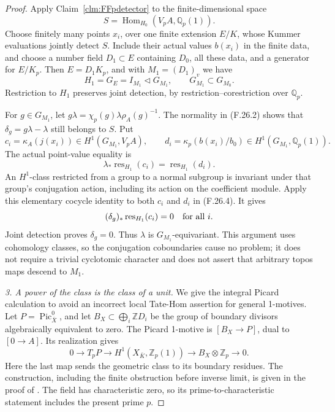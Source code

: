 \documentclass[11pt]{article}
\begin{document}
\begin{proof}
Apply Claim~\ref{clm:FFpdetector} to the finite-dimensional
space
\[
                  S=\operatorname{Hom}_{H_0}
                       (V_pA,\mathbb Q_p(1)).
\]
Choose finitely many points \(x_i\), over one finite
extension \(E/K\), whose Kummer evaluations jointly
detect \(S\). Include their actual values \(b(x_i)\)
in the finite data, and choose a number field
\(D_1\subset E\) containing \(D_0\), all these data,
and a generator for \(E/K_p\). Then
\(E=D_1K_p\), and with \(M_1=(D_1)_v\) we have
\[
        H_1=G_E=I_{M_1}\triangleleft G_{M_1},
                  \qquad G_{M_1}\subset G_{M_0}.         \tag{F.26.3}
\]
Restriction to \(H_1\) preserves joint detection,
by restriction--corestriction over \(\mathbb Q_p\).

For \(g\in G_{M_1}\), let
\(g\lambda=\chi_p(g)\lambda\rho_A(g)^{-1}\).
The normality in (F.26.2) shows that
\(\delta_g=g\lambda-\lambda\) still belongs to \(S\).
Put
\[
 c_i=\kappa_A(j(x_i))\in H^1(G_{M_1},V_pA),\qquad
 d_i=\kappa_p(b(x_i)/b_0)\in H^1(G_{M_1},\mathbb Q_p(1)).
\]
The actual point-value equality is
\[
                \lambda_*\operatorname{res}_{H_1}(c_i)
                        =\operatorname{res}_{H_1}(d_i). \tag{F.26.4}
\]
An \(H^1\)-class restricted from a group to a normal
subgroup is invariant under that group's conjugation
action, including its action on the coefficient module.
Apply this elementary cocycle identity to both \(c_i\)
and \(d_i\) in (F.26.4). It gives
\[
               (\delta_g)_*\operatorname{res}_{H_1}(c_i)=0
                                      \quad\hbox{for all }i.
\]
Joint detection proves \(\delta_g=0\). Thus \(\lambda\)
is \(G_{M_1}\)-equivariant. This argument uses cohomology
classes, so the conjugation coboundaries cause no problem;
it does not require a trivial cyclotomic character and
does not assert that arbitrary topos maps descend to
\(M_1\).

\emph{3. A power of the class is the class of a unit.}
We give the integral Picard calculation to avoid an
incorrect local Tate-Hom assertion for general 1-motives.
Let \(P=\operatorname{Pic}^0_{\bar X}\), and let
\(B_X\subset\bigoplus_i\mathbb ZD_i\) be the group
of boundary divisors algebraically equivalent to zero.
The Picard 1-motive is \([B_X\to P]\), dual to
\([0\to A]\). Its realization gives
\[
 0\longrightarrow T_pP\longrightarrow
 H^1(X_{\bar K},\mathbb Z_p(1))\longrightarrow
 B_X\otimes\mathbb Z_p\longrightarrow0.                \tag{F.26.5}
\]
Here the last map sends the geometric class to its
boundary residues. The construction, including the
finite obstruction before inverse limit, is given in
the proof of \citet[Proposition~4.1]{FF_SpiessSzamuely2003}.
The field has characteristic zero, so its prime-to-characteristic
statement includes the present prime \(p\).


\end{proof}
\end{document}
